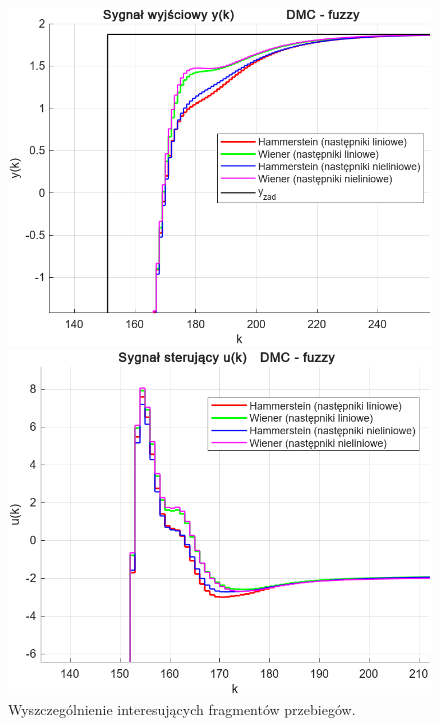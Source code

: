 \documentclass[a4paper,titlepage,11pt,floatssmall]{mwrep}
\begin{document}
\begin{figure}[p]
\begin{minipage}{0.495\linewidth}
    \centering
    \includegraphics[width=\linewidth]{pictures/DMC_fuzzy_y_zoom}
\end{minipage}
\hfill
\begin{minipage}{0.495\linewidth}
    \centering
    \includegraphics[width=\linewidth]{pictures/DMC_fuzzy_u_zoom}
\end{minipage}
\caption{Wyszczególnienie interesujących fragmentów przebiegów.}
\end{figure}
\restoregeometry

\newpage
\end{document}
